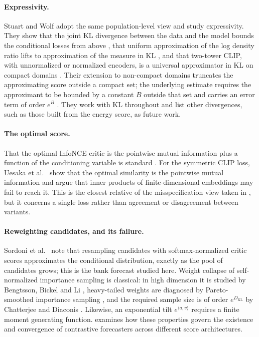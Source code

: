 \documentclass[11pt]{article}
\theoremstyle{plain}
\theoremstyle{definition}
\theoremstyle{remark}
\begin{document}
\paragraph{Expressivity.}
Stuart and Wolf \cite{stuart2026expressivity} adopt the same population-level
view and study expressivity. They show that the joint KL divergence between
the data and the model bounds the conditional losses from above
\cite[Thms.~2.5, 2.6]{stuart2026expressivity}, that uniform approximation of
the log density ratio lifts to approximation of the measure in KL
\cite[Thms.~3.2, 3.3]{stuart2026expressivity}, and that two-tower CLIP, with
unnormalized or normalized encoders, is a universal approximator in KL on
compact domains \cite[Thms.~4.1, 4.2]{stuart2026expressivity}. Their
extension to non-compact domains truncates the approximating score outside a
compact set; the underlying estimate requires the approximant to be bounded
by a constant $B$ outside that set and carries an error term of order $e^{B}$
\cite[Prop.~A.3, Thm.~3.3]{stuart2026expressivity}. They work with KL
throughout and list other divergences, such as those built from the energy
score, as future work.

\paragraph{The optimal score.}
That the optimal InfoNCE critic is the pointwise mutual information plus a
function of the conditioning variable is standard
\cite{oord2018cpc,poole2019variational}. For the symmetric CLIP loss, Uesaka
et al.\ \cite{uesaka2025weighted} show that the optimal similarity is the
pointwise mutual information and argue that inner products of
finite-dimensional embeddings may fail to reach it. This is the closest
relative of the misspecification view taken in , but it
concerns a single loss rather than agreement or disagreement between
variants.

\paragraph{Reweighting candidates, and its failure.}
Sordoni et al.\ \cite{sordoni2021decomposed} note that resampling candidates
with softmax-normalized critic scores approximates the conditional
distribution, exactly as the pool of candidates grows; this is the bank
forecast studied here. Weight collapse of self-normalized importance sampling
is classical: in high dimension it is studied by Bengtsson, Bickel and Li
\cite{bengtsson2008curse}, heavy-tailed weights are diagnosed by
Pareto-smoothed importance sampling \cite{vehtari2024pareto}, and the
required sample size is of order $e^{D_{\mathrm{KL}}}$ by Chatterjee and
Diaconis \cite{chatterjee2018sample}. Likewise, an exponential tilt
$e^{\langle a, v\rangle}$ requires a finite moment generating function.
 examines how these properties govern the existence and
convergence of contrastive forecasters across different score architectures.
\end{document}
